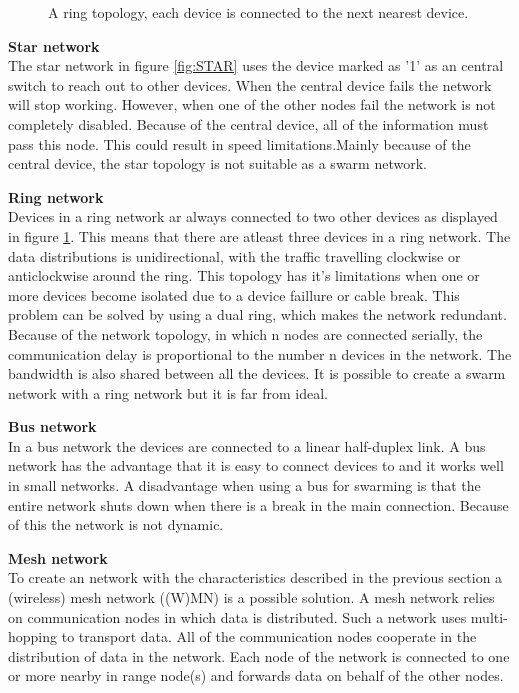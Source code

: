 \documentclass[10pt,a4paper]{article}
\begin{document}
\begin{figure}[H]
  \caption{A ring topology, each device is connected to the next nearest device.}\label{fig:RING}
\endminipage
\end{figure}

\textbf{Star network}\\
The star network in figure \ref{fig:STAR} uses the device marked as '1' as an central switch to reach out to other devices.\cite{starwiki} When the central device fails the network will stop working. However, when one of the other nodes fail the network is not completely disabled. Because of the central device, all of the information must pass this node. This could result in speed limitations.Mainly because of the central device, the star topology is not suitable as a swarm network. \cite{combook}


\textbf{Ring network}\\
Devices in a ring network ar always connected to two other devices as displayed in figure \ref{fig:RING}. This means that there are atleast three devices in a ring network. The data distributions is unidirectional, with the traffic travelling clockwise or anticlockwise around the ring. \cite{ringwiki} This topology has it's limitations when one or more devices become isolated due to a device faillure or cable break. This problem can be solved by using a dual ring, which makes the network redundant. Because of the network topology, in which n nodes are connected serially, the communication delay is proportional to the number n devices in the network. The bandwidth is also shared between all the devices. \cite{ringwiki} It is possible to create a swarm network with a ring network but it is far from ideal.

\textbf{Bus network}\\
In a bus network the devices are connected to a linear half-duplex link. \cite{bustopology} A bus network has the advantage that it is easy to connect devices to and it works well in small networks. A disadvantage when using a bus for swarming is that the entire network shuts down when there is a break in the main connection. 
Because of this the network is not dynamic.

\textbf{Mesh network}\\
To create an network with the characteristics described in the previous section a (wireless) mesh network ((W)MN) is a possible solution. A mesh network relies on communication nodes in which data is distributed. Such a network uses multi-hopping to transport data.\cite{multi-hopwirelessnetworks} All of the communication nodes cooperate in the distribution of data in the network. Each node of the network is connected to one or more nearby in range node(s) and forwards data on behalf of the other nodes. \cite{meshnetworking} \\
\end{document}
